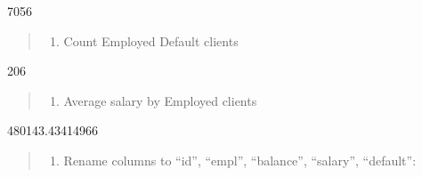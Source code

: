 \documentclass[
  letterpaper,
  DIV=11,
  numbers=noendperiod]{scrreprt}
\newenvironment{Shaded}{\begin{snugshade}}{\end{snugshade}}
\newcommand{\DecValTok}[1]{\textcolor[rgb]{0.68,0.00,0.00}{#1}}
\newcommand{\FunctionTok}[1]{\textcolor[rgb]{0.28,0.35,0.67}{#1}}
\newcommand{\NormalTok}[1]{\textcolor[rgb]{0.00,0.23,0.31}{#1}}
\newcommand{\OtherTok}[1]{\textcolor[rgb]{0.00,0.23,0.31}{#1}}
\newcommand{\SpecialCharTok}[1]{\textcolor[rgb]{0.37,0.37,0.37}{#1}}
\providecommand{\tightlist}{%
  \setlength{\itemsep}{0pt}\setlength{\parskip}{0pt}}\usepackage{longtable,booktabs,array}
\begin{document}
\begin{Shaded}
\end{Shaded}

7056

\begin{quote}
\begin{enumerate}
\def\labelenumi{\arabic{enumi}.}
\setcounter{enumi}{3}
\tightlist
\item
  Count Employed Default clients
\end{enumerate}
\end{quote}

\begin{Shaded}
\end{Shaded}

206

\begin{quote}
\begin{enumerate}
\def\labelenumi{\arabic{enumi}.}
\setcounter{enumi}{4}
\tightlist
\item
  Average salary by Employed clients
\end{enumerate}
\end{quote}

\begin{Shaded}
\end{Shaded}

480143.43414966

\begin{quote}
\begin{enumerate}
\def\labelenumi{\arabic{enumi}.}
\setcounter{enumi}{5}
\tightlist
\item
  Rename columns to ``id'', ``empl'', ``balance'', ``salary'',
  ``default'':
\end{enumerate}
\end{quote}
\end{document}
